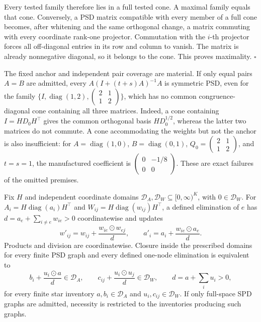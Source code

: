 Every tested family therefore lies in a full tested cone. A maximal
family equals that cone. Conversely, a PSD matrix compatible with every
member of a full cone becomes, after whitening and the same orthogonal
change, a matrix commuting with every coordinate rank-one projector.
Commutation with the \(i\)-th projector forces all off-diagonal entries
in its row and column to vanish. The matrix is already nonnegative
diagonal, so it belongs to the cone. This proves maximality. \(\square\)

The fixed anchor and independent pair coverage are material. If only equal
pairs \(A=B\) are admitted, every
\(A(I+(t+s)A)^{-1}A\) is symmetric PSD, even for the family
\(\{I,\operatorname{diag}(1,2),
\left(\begin{smallmatrix}2&1\\1&2\end{smallmatrix}\right)\}\),
which has no common congruence-diagonal cone containing all three matrices.
Indeed, a cone containing \(I=HD_0H^\top\) gives the common orthogonal
basis \(HD_0^{1/2}\), whereas the latter two matrices do not commute.
A cone accommodating the weights but not the anchor is also insufficient:
for \(A=\operatorname{diag}(1,0)\), \(B=\operatorname{diag}(0,1)\),
\(Q_0=\left(\begin{smallmatrix}2&1\\1&2\end{smallmatrix}\right)\),
and \(t=s=1\), the manufactured coefficient is
\(\left(\begin{smallmatrix}0&-1/8\\0&0\end{smallmatrix}\right)\).
These are exact failures of the omitted premises.

Fix \(H\) and independent coordinate domains
\(\mathscr D_A,\mathscr D_W\subseteq[0,\infty)^K\), with
\(0\in\mathscr D_W\). For
\(A_i=H\operatorname{diag}(a_i)H^\top\) and
\(W_{ij}=H\operatorname{diag}(w_{ij})H^\top\), a defined elimination
of \(e\) has \(d=a_e+\sum_{i\ne e}w_{ie}>0\) coordinatewise and updates
\begin{equation}
w'_{ij}=w_{ij}+\frac{w_{ie}\odot w_{ej}}{d},\qquad
a'_i=a_i+\frac{w_{ie}\odot a_e}{d}.
\label{eq:cg-kron-scalar-updates}
\end{equation}
Products and division are coordinatewise. Closure inside the prescribed
domains for every finite PSD graph and every defined one-node elimination
is equivalent to
\begin{equation}
b_i+\frac{u_i\odot a}{d}\in\mathscr D_A,\qquad
c_{ij}+\frac{u_i\odot u_j}{d}\in\mathscr D_W,\qquad
d=a+\sum_i u_i>0,
\label{eq:cg-kron-star-domain}
\end{equation}
for every finite star inventory
\(a,b_i\in\mathscr D_A\) and \(u_i,c_{ij}\in\mathscr D_W\).
If only full-space SPD graphs are admitted, necessity is restricted to
the inventories producing such graphs.

